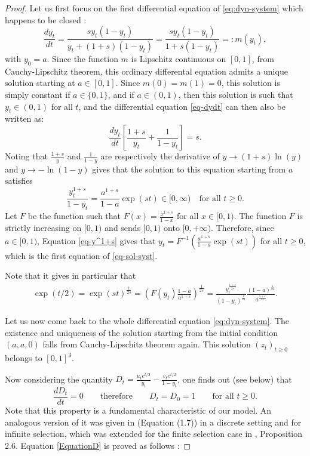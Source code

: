 \documentclass[11pt]{article}
\theoremstyle{remark}
\numberwithin{equation}{section}
\begin{document}
\begin{proof} Let us first focus on the first differential equation of \eqref{eq:dyn-system} which happens to be closed : \begin{equation}\label{eq-dydt}\frac{dy_t}{dt}=\frac{sy_t(1-y_t)}{y_t+(1+s)(1-y_t)}=\frac{sy_t(1-y_t)}{1+s(1-y_t)}=:m(y_t),\end{equation} with $y_0=a$. Since the function $m$ is Lipschitz continuous on $[0,1]$, from Cauchy-Lipschitz theorem, this ordinary differental equation admits a unique solution starting at $a\in[0,1]$. Since $m(0)=m(1)=0$, this solution is simply constant if $a\in\{0,1\}$, and if $a\in(0,1)$, then this solution is such that $y_t\in(0,1)$ for all $t$, and the differential equation \eqref{eq-dydt} can then also be written as:
$$\frac{dy_t}{dt}\left[\frac{1+s}{y_t}+\frac{1}{1-y_t}\right]=s.$$ Noting that $\frac{1+s}{y}$ and $\frac{1}{1-y}$ are respectively the derivative of $y\rightarrow(1+s)\ln(y)$ and $y\rightarrow-\ln(1-y)$ gives that the solution to this equation starting from $a$ satisfies 
\begin{equation}\label{eq-y^1+s}\frac{y_t^{1+s}}{1-y_t}=\frac{a^{1+s}}{1-a}\exp(st)\in[0,\infty) \quad\text{for all $t\geq0$}.\end{equation} Let $F$ be the function such that $F(x)=\frac{x^{1+s}}{1-x}$ for all $x\in[0,1)$. The function $F$ is strictly increasing on $[0,1)$ and sends $[0,1)$ onto $[0,+\infty)$. Therefore, since $a\in[0,1)$, Equation \eqref{eq-y^1+s} gives that
$y_t= F^{-1}\left(\frac{a^{1+s}}{1-a}\exp(st)\right)$ for all $t\geq0$, which is the first equation of \eqref{eq-sol-syst}. 

\medskip
Note that it gives in particular that 
\begin{align}\label{eq-yt}
\exp(t/2)=\exp(st)^{\frac{1}{2s}}=\left(F(y_t)\frac{1-a}{a^{1+s}}\right)^{\frac{1}{2s}}=\frac{y_t^{\frac{1+s}{2s}}}{(1-y_t)^{\frac{1}{2s}}}\frac{(1-a)^{\frac{1}{2s}}}{a^{\frac{1+s}{2s}}}.
\end{align}

Let us now come back to the whole differential equation \eqref{eq:dyn-system}. The existence and uniqueness of the solution starting from the initial condition $(a,a,0)$ falls from Cauchy-Lipschitz theorem again. This solution $(z_t)_{t\geq0}$ belongs to $[0,1]^3$.

Now considering the quantity $D_t=\frac{u_te^{t/2}}{y_t}-\frac{v_te^{t/2}}{1-y_t}$, one finds out (see below) that \begin{equation}\label{EquationD}\frac{dD_t}{dt}=0 \qquad \text{therefore}\qquad D_t=D_0=1 \qquad\text{for all $t\geq0$.}\end{equation} Note that this property is a fundamental characteristic of our model. An analogous version of it was given in \cite{CoronLeJan22} (Equation (1.7)) in a discrete setting and for infinite selection, which was extended for the finite selection case in \cite{coronLeJan2024}, Proposition 2.6. Equation \eqref{EquationD} is proved as follows : 


\end{proof}
\end{document}
